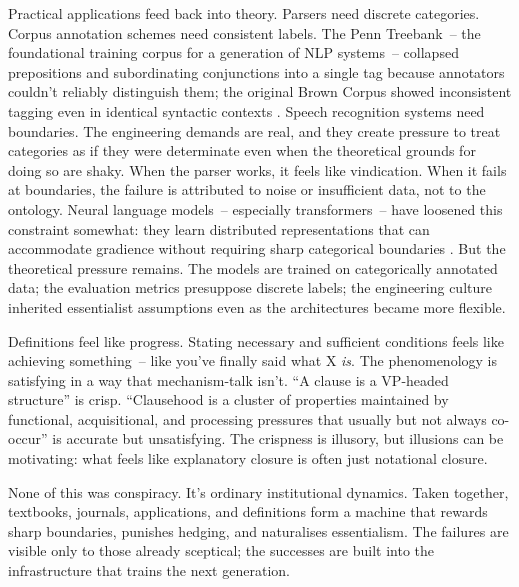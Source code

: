 Practical applications feed back into theory. Parsers need discrete categories. Corpus annotation schemes need consistent labels. The Penn Treebank~-- the foundational training corpus for a generation of NLP systems~-- collapsed prepositions and subordinating conjunctions into a single tag because annotators couldn't reliably distinguish them; the original Brown Corpus showed inconsistent tagging even in identical syntactic contexts \autocite{marcus1993}. Speech recognition systems need boundaries. The engineering demands are real, and they create pressure to treat categories as if they were determinate even when the theoretical grounds for doing so are shaky. When the parser works, it feels like vindication. When it fails at boundaries, the failure is attributed to noise or insufficient data, not to the ontology. Neural language models~-- especially transformers~-- have loosened this constraint somewhat: they learn distributed representations that can accommodate gradience without requiring sharp categorical boundaries \autocite{vaswani2017attention}. But the theoretical pressure remains. The models are trained on categorically annotated data; the evaluation metrics presuppose discrete labels; the engineering culture inherited essentialist assumptions even as the architectures became more flexible.

Definitions feel like progress. Stating necessary and sufficient conditions feels like achieving something~-- like you've finally said what X \emph{is}. The phenomenology is satisfying in a way that mechanism-talk isn't. \enquote{A clause is a VP-headed structure} is crisp. \enquote{Clausehood is a cluster of properties maintained by functional, acquisitional, and processing pressures that usually but not always co-occur} is accurate but unsatisfying. The crispness is illusory, but illusions can be motivating: what feels like explanatory closure is often just notational closure.

None of this was conspiracy. It's ordinary institutional dynamics. Taken together, textbooks, journals, applications, and definitions form a machine that rewards sharp boundaries, punishes hedging, and naturalises essentialism. The failures are visible only to those already sceptical; the successes are built into the infrastructure that trains the next generation.

